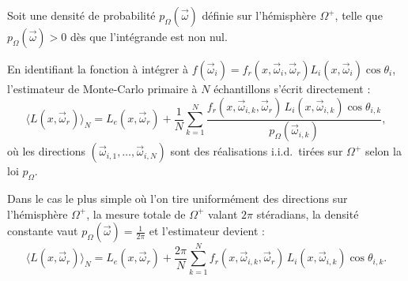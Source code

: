 \begin{proposition}
    Soit une densité de probabilité $p_\Omega(\vec{\omega})$ définie sur l'hémisphère $\Omega^+$, telle que $p_\Omega(\vec{\omega}) > 0$ dès que l'intégrande est non nul. 

    En identifiant la fonction à intégrer à $f(\vec{\omega}_i) = f_r(x, \vec{\omega}_i, \vec{\omega}_r) L_i(x, \vec{\omega}_i) \cos\theta_i$, l'estimateur de Monte-Carlo primaire à $N$ échantillons s'écrit directement :
    \begin{equation}
        \langle L(x, \vec{\omega}_r) \rangle_N = L_e(x, \vec{\omega}_r) + \frac{1}{N} \sum_{k=1}^N \frac{f_r(x, \vec{\omega}_{i,k}, \vec{\omega}_r) \, L_i(x, \vec{\omega}_{i,k}) \cos\theta_{i,k}}{p_\Omega(\vec{\omega}_{i,k})},
    \end{equation}
    où les directions $(\vec{\omega}_{i,1}, \dots, \vec{\omega}_{i,N})$ sont des réalisations i.i.d.\ tirées sur $\Omega^+$ selon la loi $p_\Omega$.
\end{proposition}

\begin{example}
    Dans le cas le plus simple où l'on tire uniformément des directions sur l'hémisphère $\Omega^+$, la mesure totale de $\Omega^+$ valant $2\pi$ stéradians, la densité constante vaut $p_\Omega(\vec{\omega}) = \frac{1}{2\pi}$ et l'estimateur devient :
    \begin{equation}
        \langle L(x, \vec{\omega}_r) \rangle_N = L_e(x, \vec{\omega}_r) + \frac{2\pi}{N} \sum_{k=1}^N f_r(x, \vec{\omega}_{i,k}, \vec{\omega}_r) \, L_i(x, \vec{\omega}_{i,k}) \cos\theta_{i,k}.
    \end{equation}
\end{example}


